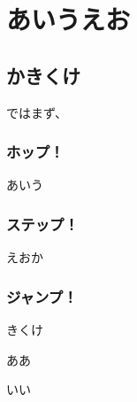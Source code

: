 \documentclass[head_space=20mm,foot_space=20mm,gutter=10mm,line_length=190mm]{jlreq}
\newcommand{\hop}[0]{\subsubsection*{ホップ！}}
\newcommand{\step}[0]{\subsubsection*{ステップ！}}
\newcommand{\jump}[0]{\subsubsection*{ジャンプ！}}
\begin{document}
\maketitle


\tableofcontents %


\clearpage
\section{あいうえお}
\subsection{かきくけ}
ではまず、
\hop
あいう
\step
えおか
\jump
きくけ


\clearpage
\begin{thebibliography}{99}
\item ああ
\item いい
\end{thebibliography}
\end{document}
